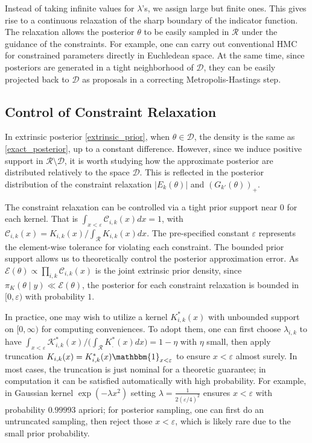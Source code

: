 \documentclass[10pt]{article}
\newcommand{\mc}[1]{\mathcal{#1}}
\begin{document}
Instead of taking infinite values for $\lambda$'s, we assign large but finite ones. This gives rise to a continuous relaxation of the sharp boundary of the indicator function. The relaxation allows the posterior $\theta$ to be easily sampled in $\mc R$ under the guidance of the constraints. For example, one can carry out conventional HMC for constrained parameters directly in Euchledean space. At the same time, since posteriors are generated in a tight neighborhood of $\mc D$, they can be easily projected back to $\mc D$ as proposals in a correcting Metropolis-Hastings step.

\subsection{Control of Constraint Relaxation}

In extrinsic posterior \eqref{extrinsic_prior}, when $\theta \in \mc D$, the density is the same as \eqref{exact_posterior}, up to a constant difference. However, since we induce positive support in $\mc R \setminus \mc D$, it is worth studying how the approximate posterior are distributed relatively to the space $\mc D$. This is reflected in the posterior distribution of the constraint relaxation $|E_k(\theta)|$ and $(G_{k'}(\theta))_+$.

The constraint relaxation can be controlled via a tight prior support near $0$ for each kernel.  That is $\int_{x<\varepsilon} \mc C_{i,k}(x)  dx= 1$, with  $\mc C_{i,k}(x) = K_{i,k}(x) / \int_{\mc R}K_{i,k}(x) dx$. The pre-specified constant $\varepsilon$ represents the element-wise tolerance for violating each constraint. The bounded prior support allows us to theoretically control the posterior approximation error. As $\mc E(\theta) \propto \prod_{i,k} \mc C_{i,k}(x)$ is the joint extrinsic prior density, since $\pi_K(\theta \mid y) \ll \mc E(\theta)$, the posterior for each constraint relaxation is bounded in $[0,\varepsilon)$ with probability $1$.

In practice, one may wish to utilize a kernel $K^*_{i,k}(x)$ with unbounded support on $[0,\infty)$ for computing conveniences. To adopt them, one can first choose $\lambda_{i,k}$ to have $\int_{x<\varepsilon} \mc K^*_{i,k}(x)/ \big( \int_{\mc R} K^*_{.}(x) dx\big ) = 1-\eta$ with $\eta$ small, then apply truncation $K_{i,k}(x)= K^*_{i,k}(x) \mathbbm{1}_{x<\varepsilon}$ to ensure $x<\varepsilon$ almost surely. In most cases, the truncation is just nominal for a theoretic guarantee; in computation it can be satisfied automatically with high probability. For example, in Gaussian kernel $\exp( -{\lambda x^2})$ setting $\lambda = \frac{1}{ 2(\varepsilon/4)^2}$ ensures $x<\varepsilon$ with probability $0.99993$ apriori; for posterior sampling, one can first do an untruncated sampling, then reject those $x<\varepsilon$, which is likely rare due to the small prior probability. 
\end{document}

